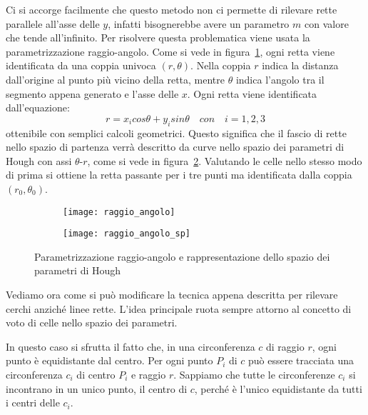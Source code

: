Ci si accorge facilmente che questo metodo non ci permette di rilevare rette parallele all'asse delle $y$, infatti bisognerebbe avere un parametro $m$ con valore che tende all'infinito.
Per risolvere questa problematica viene usata la parametrizzazione raggio-angolo.
Come si vede in figura~\ref{fig:hough_parametr_parametr}, ogni retta viene identificata da una coppia univoca $(r,\theta)$.
Nella coppia $r$ indica la distanza dall'origine al punto più vicino della retta, mentre $\theta$ indica l'angolo tra il segmento appena generato e l'asse delle $x$.
Ogni retta viene identificata dall'equazione:
\begin{equation} \label{eq:raggio_angolo_parametr}
  r = x_i cos \theta + y_i sin \theta \quad con \quad i=1,2,3
\end{equation}
ottenibile con semplici calcoli geometrici.
Questo significa che il fascio di rette nello spazio di partenza verrà descritto da curve nello spazio dei parametri di Hough con assi $\theta$-$r$, come si vede in figura~\ref{fig:hough_parametr_curve}.
Valutando le celle nello stesso modo di prima si ottiene la retta passante per i tre punti ma identificata dalla coppia $(r_0,\theta_0)$.

\begin{figure}[ht]
  \begin{center}
    \begin{subfigure}{.4\linewidth}
      \centering\texttt{[image: raggio\_angolo]}
      \caption{}
      \label{fig:hough_parametr_parametr}
    \end{subfigure}
    \begin{subfigure}{.4\linewidth}
      \centering\texttt{[image: raggio\_angolo\_sp]}
      \caption{}
      \label{fig:hough_parametr_curve}
    \end{subfigure}
  \end{center}
  \caption{Parametrizzazione raggio-angolo e rappresentazione dello spazio dei parametri di Hough}
  \label{fig:hough_parametr_raggio-angolo}
\end{figure}

Vediamo ora come si può modificare la tecnica appena descritta per rilevare cerchi anziché linee rette.
L'idea principale ruota sempre attorno al concetto di voto di celle nello spazio dei parametri.

In questo caso si sfrutta il fatto che, in una circonferenza $c$ di raggio $r$, ogni punto è equidistante dal centro.
Per ogni punto $P_i$ di $c$ può essere tracciata una circonferenza $c_i$ di centro $P_i$ e raggio $r$.
Sappiamo che tutte le circonferenze $c_i$ si incontrano in un unico punto, il centro di $c$, perché è l'unico equidistante da tutti i centri delle $c_i$.

